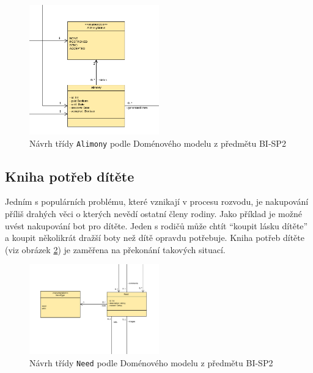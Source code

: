         \begin{figure}\centering
	        \includegraphics[width=0.5\textwidth]{pdfs/Alimony1}
	        \caption[Návrh Alimony]{Návrh třídy \texttt{Alimony} podle Doménového modelu z předmětu BI-SP2}\label{image:Alimony1}
        \end{figure}
    \subsection{Kniha potřeb dítěte}
    
        Jedním s populárních problému, které vznikají v procesu rozvodu, je nakupování příliš drahých věci o kterých nevědí ostatní členy rodiny. Jako příklad je možné uvést nakupování bot pro dítěte. Jeden s rodičů může chtít \enquote{koupit lásku dítěte} a koupit několikrát dražší boty než dítě opravdu potřebuje. Kniha potřeb dítěte (viz obrázek \ref{image:Need1}) je zaměřena na překonání takových situací.
        \begin{figure}\centering
	        \includegraphics[width=0.5\textwidth]{pdfs/Need1}
	        \caption[Návrh Need]{Návrh třídy \texttt{Need} podle Doménového modelu z předmětu BI-SP2}\label{image:Need1}
        \end{figure}
        
